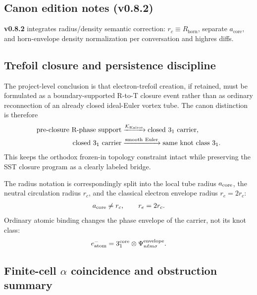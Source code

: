 \documentclass[11pt]{article}
\theoremstyle{definition}
\theoremstyle{plain}
\theoremstyle{remark}
\newcommand{\rc}{{r_c}}
\begin{document}
        \subsection{Canon edition notes (v0.8.2)}
            \textbf{v0.8.2} integrates radius/density semantic correction: $\rc \equiv R_{\mathrm{horn}}$, separate $a_{\mathrm{core}}$, and horn-envelope density normalization per conversation and highres diffs.


        \subsection{Trefoil closure and persistence discipline}
            The project-level conclusion is that electron-trefoil creation, if
            retained, must be formulated as a boundary-supported R-to-T closure
            event rather than as ordinary reconnection of an already closed
            ideal-Euler vortex tube. The canon distinction is therefore
            \begin{align}
                \text{pre-closure R-phase support}
                &\xrightarrow{\mathcal{K}_{\rm Kairos}}
                \text{closed }3_1\text{ carrier},\\
                \text{closed }3_1\text{ carrier}
                &\xrightarrow{\rm smooth\ Euler}
                \text{same knot class }3_1 .
            \end{align}
            This keeps the orthodox frozen-in topology constraint intact while
            preserving the SST closure program as a clearly labeled bridge.

            The radius notation is correspondingly split into the local tube
            radius \(a_{\rm core}\), the neutral circulation radius \(\rc\), and
            the classical electron envelope radius \(r_e=2\rc\):
            \begin{align}
                a_{\rm core} \neq \rc,
                \qquad
                r_e=2\rc .
            \end{align}
            Ordinary atomic binding changes the phase envelope of the carrier,
            not its knot class:
            \begin{align}
                e^-_{\rm atom}
                =
                3_1^{\rm core}\otimes\Psi_{n\ell m\sigma}^{\rm envelope} .
            \end{align}


        \subsection{Finite-cell $\alpha$ coincidence and obstruction summary}
            \label{subsec:finite_cell_alpha_obstruction}
\end{document}
